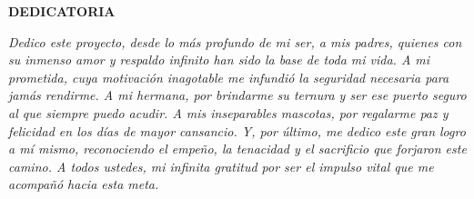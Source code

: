 \begin{center}
    \vspace*{0.5cm}
    {\bfseries DEDICATORIA}
\end{center}
\vspace{1.5cm}

\begin{flushright}
    \begin{minipage}{0.65\textwidth}
        \itshape
        \justifying
        \noindent
        Dedico este proyecto, desde lo más profundo de mi ser, a mis padres, quienes con su inmenso amor y respaldo infinito han sido la base de toda mi vida. A mi prometida, cuya motivación inagotable me infundió la seguridad necesaria para jamás rendirme. A mi hermana, por brindarme su ternura y ser ese puerto seguro al que siempre puedo acudir. A mis inseparables mascotas, por regalarme paz y felicidad en los días de mayor cansancio. Y, por último, me dedico este gran logro a mí mismo, reconociendo el empeño, la tenacidad y el sacrificio que forjaron este camino. A todos ustedes, mi infinita gratitud por ser el impulso vital que me acompañó hacia esta meta.
    \end{minipage}
\end{flushright}

\newpage

